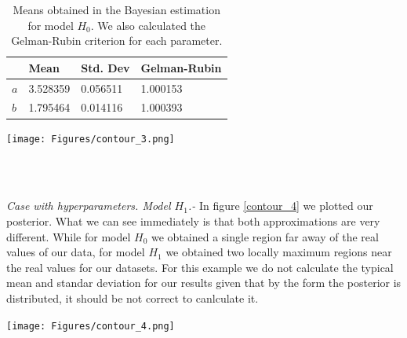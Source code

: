 \documentclass[onecolumn,           %
               showpacs,            %
               preprintnumbers,     %
               aps,                 %
               letterpaper,             %
               superscriptaddress,      %
               nofootinbib,         %
               tightenlines,        %
               floats,floatfix      %
               ,usenatbib,
               ]{revtex4-1}
\begin{document}
\begin{table}[h!]
\centering
\begin{tabular}{||l|l|l|l||} 
 \hline
 & \textbf{Mean} & \textbf{Std. Dev} & \textbf{Gelman-Rubin} \\ [0.5ex] 
 \hline\hline
$a$ & 3.528359 	 & 0.056511 & 1.000153 \\
\hline
$b$ & 1.795464 & 0.014116 	 	 & 1.000393\\ [1ex] 
 \hline
\end{tabular}
\caption{\footnotesize{Means obtained in the Bayesian estimation for model $H_0$. We also calculated the Gelman-Rubin criterion for each parameter.}}
\label{tab2}
\end{table}

\begin{minipage}{\textwidth}
\centering
\texttt{[image: Figures/contour\_3.png]}
\label{contour_3}
\end{minipage}\\ $ $

\textit{Case with hyperparameters. Model $H_1$.-} In figure \ref{contour_4} we plotted our posterior. What we can see immediately is that both approximations are very different. While for model $H_0$ we obtained a single region far away of the real values of our data, for model $H_1$ we obtained two locally maximum regions near the real values for our datasets. For this example we do not calculate the typical mean and standar deviation for our results given that by the form the posterior is distributed, it should be not correct to canlculate it.  


\begin{minipage}{\textwidth}
\centering
\texttt{[image: Figures/contour\_4.png]}
\label{contour_4}
\end{minipage}\\ $ $
\end{document}
